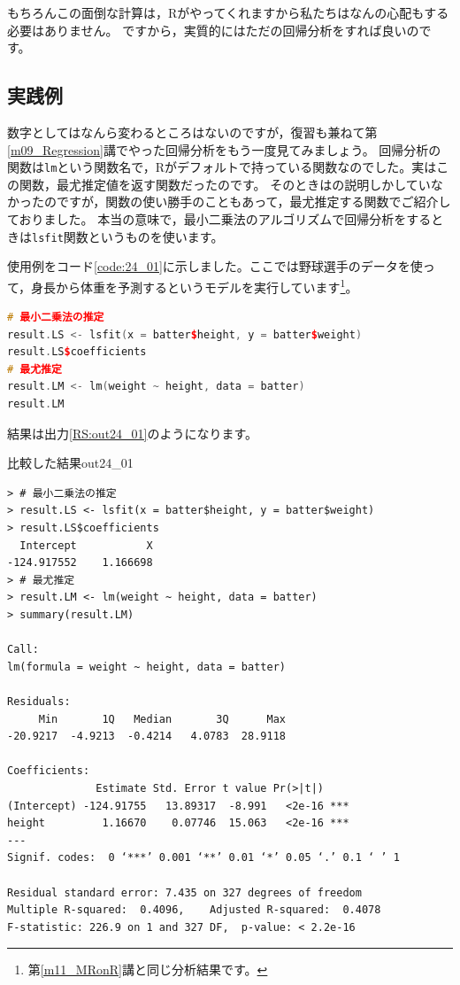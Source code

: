 \documentclass{ltjbook}
\begin{document}
もちろんこの面倒な計算は，Rがやってくれますから私たちはなんの心配もする必要はありません。
ですから，実質的にはただの回帰分析をすれば良いのです。

\subsection{実践例}
数字としてはなんら変わるところはないのですが，復習も兼ねて第\ref{m09_Regression}講でやった回帰分析をもう一度見てみましょう。
回帰分析の関数は\verb|lm|という関数名で，Rがデフォルトで持っている関数なのでした。実はこの関数，最尤推定値を返す関数だったのです。
そのときはの説明しかしていなかったのですが，関数の使い勝手のこともあって，最尤推定する関数でご紹介しておりました。
本当の意味で，最小二乗法のアルゴリズムで回帰分析をするときは\verb|lsfit|関数というものを使います。

使用例をコード\ref{code:24_01}に示しました。ここでは野球選手のデータを使って，身長から体重を予測するというモデルを実行しています\footnote{第\ref{m11_MRonR}講と同じ分析結果です。}。
\begin{lstlisting}[language=c++,label={code:24_01},caption={二つの推定法の比較}]
# 最小二乗法の推定
result.LS <- lsfit(x = batter$height, y = batter$weight)
result.LS$coefficients
# 最尤推定
result.LM <- lm(weight ~ height, data = batter)
result.LM
\end{lstlisting}
結果は出力\ref{RS:out24_01}のようになります。
\begin{Rscreen}{比較した結果}{out24_01}
	\begin{verbatim}
> # 最小二乗法の推定
> result.LS <- lsfit(x = batter$height, y = batter$weight)
> result.LS$coefficients
  Intercept           X 
-124.917552    1.166698 
> # 最尤推定
> result.LM <- lm(weight ~ height, data = batter)
> summary(result.LM)

Call:
lm(formula = weight ~ height, data = batter)

Residuals:
     Min       1Q   Median       3Q      Max 
-20.9217  -4.9213  -0.4214   4.0783  28.9118 

Coefficients:
              Estimate Std. Error t value Pr(>|t|)    
(Intercept) -124.91755   13.89317  -8.991   <2e-16 ***
height         1.16670    0.07746  15.063   <2e-16 ***
---
Signif. codes:  0 ‘***’ 0.001 ‘**’ 0.01 ‘*’ 0.05 ‘.’ 0.1 ‘ ’ 1

Residual standard error: 7.435 on 327 degrees of freedom
Multiple R-squared:  0.4096,	Adjusted R-squared:  0.4078 
F-statistic: 226.9 on 1 and 327 DF,  p-value: < 2.2e-16
    \end{verbatim}
\end{Rscreen}
\end{document}
